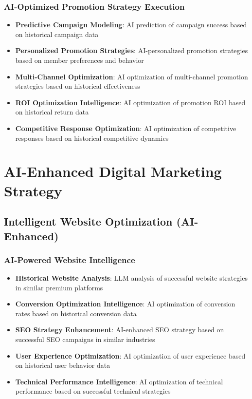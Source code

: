 \subsubsection{AI-Optimized Promotion Strategy Execution}

\begin{itemize}
    \item \textbf{Predictive Campaign Modeling}: AI prediction of campaign success based on historical campaign data
    \item \textbf{Personalized Promotion Strategies}: AI-personalized promotion strategies based on member preferences and behavior
    \item \textbf{Multi-Channel Optimization}: AI optimization of multi-channel promotion strategies based on historical effectiveness
    \item \textbf{ROI Optimization Intelligence}: AI optimization of promotion ROI based on historical return data
    \item \textbf{Competitive Response Optimization}: AI optimization of competitive responses based on historical competitive dynamics
\end{itemize}

\section{AI-Enhanced Digital Marketing Strategy}

\subsection{Intelligent Website Optimization (AI-Enhanced)}

\subsubsection{AI-Powered Website Intelligence}

\begin{itemize}
    \item \textbf{Historical Website Analysis}: LLM analysis of successful website strategies in similar premium platforms
    \item \textbf{Conversion Optimization Intelligence}: AI optimization of conversion rates based on historical conversion data
    \item \textbf{SEO Strategy Enhancement}: AI-enhanced SEO strategy based on successful SEO campaigns in similar industries
    \item \textbf{User Experience Optimization}: AI optimization of user experience based on historical user behavior data
    \item \textbf{Technical Performance Intelligence}: AI optimization of technical performance based on successful technical strategies
\end{itemize}

